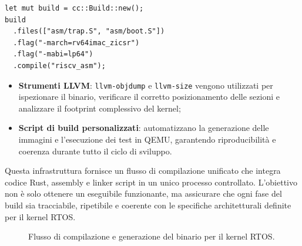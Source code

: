 \documentclass[italian, Lau, oneside]{sapthesis} %
\begin{document}
\begin{center}
\begin{verbatim}
let mut build = cc::Build::new();
build
  .files(["asm/trap.S", "asm/boot.S"])
  .flag("-march=rv64imac_zicsr")
  .flag("-mabi=lp64")
  .compile("riscv_asm");
\end{verbatim}
\end{center}

\begin{itemize}
    \item \textbf{Strumenti LLVM}: \texttt{llvm-objdump} e \texttt{llvm-size} vengono utilizzati per ispezionare il binario, verificare il corretto posizionamento delle sezioni e analizzare il footprint complessivo del kernel;
    \item \textbf{Script di build personalizzati}: automatizzano la generazione delle immagini e l’esecuzione dei test in QEMU, garantendo riproducibilità e coerenza durante tutto il ciclo di sviluppo.
\end{itemize}

\medskip
Questa infrastruttura fornisce un flusso di compilazione unificato che integra codice Rust, assembly e linker script in un unico processo controllato.  
L’obiettivo non è solo ottenere un eseguibile funzionante, ma assicurare che ogni fase del build sia tracciabile, ripetibile e coerente con le specifiche architetturali definite per il kernel RTOS.

\begin{figure}[H]
\centering
{}
\caption{Flusso di compilazione e generazione del binario per il kernel RTOS.}
\label{fig:build_flow}
\end{figure}
\end{document}
